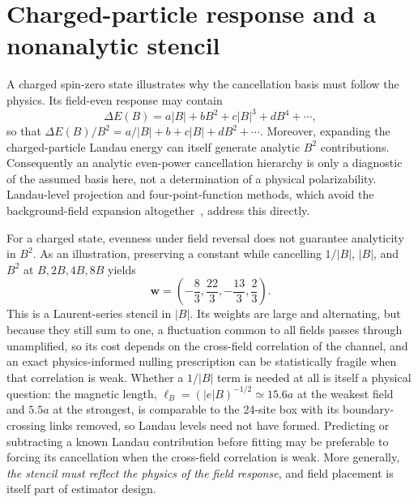 \documentclass[aps,prd,reprint,twocolumn,superscriptaddress,nofootinbib,longbibliography]{revtex4-2}
\begin{document}
\section{Charged-particle response and a nonanalytic stencil}
\label{app:pion}

A charged spin-zero state illustrates why the cancellation basis must follow the physics. Its field-even response may contain
\begin{equation}
\Delta E(B)=a|B|+bB^2+c|B|^3+dB^4+\cdots,
\label{eq:landau}
\end{equation}
so that $\Delta E(B)/B^2=a/|B|+b+c|B|+dB^2+\cdots$. Moreover, expanding the charged-particle Landau energy can itself generate analytic $B^2$ contributions. Consequently an analytic even-power cancellation hierarchy is only a diagnostic of the assumed basis here, not a determination of a physical polarizability. Landau-level projection \cite{TiburziVayl2013,Bignell2020Pion} and four-point-function methods, which avoid the background-field expansion altogether~\cite{Lee2023PionElec4pt,Lee2023PionMag4pt,LeeNeutral:2024,Wang:2024}, address this directly.

For a charged state, evenness under field reversal does not guarantee analyticity in $B^2$. As an illustration, preserving a constant while cancelling $1/|B|$, $|B|$, and $B^2$ at $B,2B,4B,8B$ yields
\begin{equation}
\bm w=\left(-\frac83,\frac{22}{3},-\frac{13}{3},\frac23\right).
\end{equation}
This is a Laurent-series stencil in $|B|$. Its weights are large and alternating, but because they still sum to one, a fluctuation common to all fields passes through unamplified, so its cost depends on the cross-field correlation of the channel, and an exact physics-informed nulling prescription can be statistically fragile when that correlation is weak. Whether a $1/|B|$ term is needed at all is itself a physical question: the magnetic length, $\ell_B=(|e|B)^{-1/2}\simeq 15.6a$ at the weakest field and $5.5a$ at the strongest, is comparable to the 24-site box with its boundary-crossing links removed, so Landau levels need not have formed. Predicting or subtracting a known Landau contribution before fitting may be preferable to forcing its cancellation when the cross-field correlation is weak. More generally, \emph{the stencil must reflect the physics of the field response}, and field placement is itself part of estimator design.

%

\end{document}
